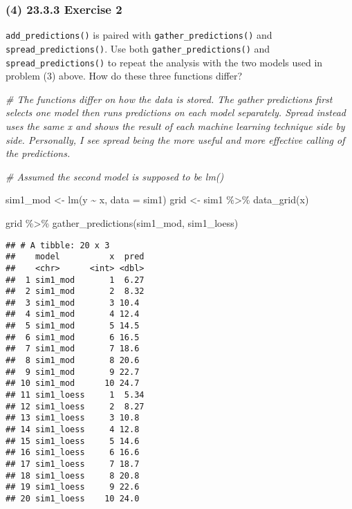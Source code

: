 \documentclass[
]{article}
\newenvironment{Shaded}{\begin{snugshade}}{\end{snugshade}}
\newcommand{\AttributeTok}[1]{\textcolor[rgb]{0.77,0.63,0.00}{#1}}
\newcommand{\CommentTok}[1]{\textcolor[rgb]{0.56,0.35,0.01}{\textit{#1}}}
\newcommand{\FunctionTok}[1]{\textcolor[rgb]{0.00,0.00,0.00}{#1}}
\newcommand{\NormalTok}[1]{#1}
\newcommand{\OtherTok}[1]{\textcolor[rgb]{0.56,0.35,0.01}{#1}}
\newcommand{\SpecialCharTok}[1]{\textcolor[rgb]{0.00,0.00,0.00}{#1}}
\begin{document}
\hypertarget{exercise-2-1}{%
\subsubsection{(4) 23.3.3 Exercise 2}\label{exercise-2-1}}

\texttt{add\_predictions()} is paired with
\texttt{gather\_predictions()} and \texttt{spread\_predictions()}. Use
both \texttt{gather\_predictions()} and \texttt{spread\_predictions()}
to repeat the analysis with the two models used in problem (3) above.
How do these three functions differ?

\begin{Shaded}
\begin{Highlighting}[]
\CommentTok{\# The functions differ on how the data is stored. The gather predictions first selects one model then runs predictions on each model separately. Spread instead uses the same x and shows the result of each machine learning technique side by side. Personally, I see spread being the more useful and more effective calling of the predictions.}


\CommentTok{\# Assumed the second model is supposed to be \textquotesingle{}lm()\textquotesingle{}}

\NormalTok{sim1\_mod }\OtherTok{\textless{}{-}} \FunctionTok{lm}\NormalTok{(y }\SpecialCharTok{\textasciitilde{}}\NormalTok{ x, }\AttributeTok{data =}\NormalTok{ sim1)}
\NormalTok{grid }\OtherTok{\textless{}{-}}\NormalTok{ sim1 }\SpecialCharTok{\%\textgreater{}\%}
  \FunctionTok{data\_grid}\NormalTok{(x)}

\NormalTok{grid }\SpecialCharTok{\%\textgreater{}\%}
  \FunctionTok{gather\_predictions}\NormalTok{(sim1\_mod, sim1\_loess)}
\end{Highlighting}
\end{Shaded}

\begin{verbatim}
## # A tibble: 20 x 3
##    model          x  pred
##    <chr>      <int> <dbl>
##  1 sim1_mod       1  6.27
##  2 sim1_mod       2  8.32
##  3 sim1_mod       3 10.4 
##  4 sim1_mod       4 12.4 
##  5 sim1_mod       5 14.5 
##  6 sim1_mod       6 16.5 
##  7 sim1_mod       7 18.6 
##  8 sim1_mod       8 20.6 
##  9 sim1_mod       9 22.7 
## 10 sim1_mod      10 24.7 
## 11 sim1_loess     1  5.34
## 12 sim1_loess     2  8.27
## 13 sim1_loess     3 10.8 
## 14 sim1_loess     4 12.8 
## 15 sim1_loess     5 14.6 
## 16 sim1_loess     6 16.6 
## 17 sim1_loess     7 18.7 
## 18 sim1_loess     8 20.8 
## 19 sim1_loess     9 22.6 
## 20 sim1_loess    10 24.0
\end{verbatim}
\end{document}

